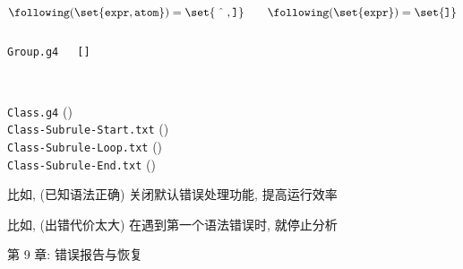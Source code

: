 \begin{frame}{}
  \[
    \following(\set{\texttt{expr}, \texttt{atom}}) = \set{\hat{\quad}, \texttt{]}} \qquad
    \following(\set{\texttt{expr}}) = \set{\texttt{]}}
  \]

  \vspace{-0.20cm}
  \begin{columns}
      \begin{center}

        \vspace{0.50cm}
        \texttt{Group.g4} \\[15pt]
      \end{center}
      \begin{center}

        \vspace{0.50cm}
        \texttt{[]}
      \end{center}
  \end{columns}

  \pause
  \vspace{0.60cm}
  \begin{center}
  \end{center}
\end{frame}

\begin{frame}{}
  \begin{center}

    \vspace{0.80cm}
     \\[20pt]

    \texttt{Class.g4} (\texttt{}) \\[20pt]
    \texttt{Class-Subrule-Start.txt} () \\[10pt]
    \texttt{Class-Subrule-Loop.txt} () \\[10pt]
    \texttt{Class-Subrule-End.txt} ()
  \end{center}
\end{frame}

\begin{frame}{}
  \begin{center}

    \vspace{0.50cm}
    比如, (已知语法正确) 关闭默认错误处理功能, 提高运行效率

    \vspace{0.50cm}
    比如, (出错代价太大) 在遇到第一个语法错误时, 就停止分析
  \end{center}
\end{frame}

\begin{frame}{}

  \begin{center}
    第 9 章: 错误报告与恢复
  \end{center}
\end{frame}
